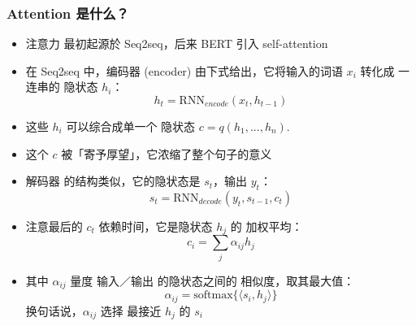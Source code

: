 \documentclass[16pt]{beamer}
\newcommand{\emp}[1]{{\color{violet}#1}}
\begin{document}
\begin{frame}
\frametitle{Attention 是什么？}
\begin{itemize}
	\item 注意力 最初起源於 Seq2seq，后来 BERT 引入 self-attention

	\item 在 Seq2seq 中，编码器 (encoder) 由下式给出，它将输入的词语 $x_i$ 转化成 一连串的 隐状态 $h_i$：
	\begin{equation}
	h_t = \mbox{RNN}_{encode}(x_t, h_{t-1})
	\end{equation}

	\item 这些 $h_i$ 可以综合成单一个 隐状态 $c = q(h_1, ..., h_n)$. 

	\item 这个 $c$ 被「寄予厚望」，它浓缩了整个句子的意义
	
	\item 解码器 的结构类似，它的隐状态是 $s_t$，输出 $y_t$：
	\begin{equation}
	s_t = \mbox{RNN}_{decode}(y_t, s_{t-1}, c_t)
	\end{equation}
	
	\item 注意最后的 $c_t$ 依赖时间，它是隐状态 $h_j$ 的 \emp{加权平均}：
	\begin{equation}
	c_i = \sum_j \alpha_{ij} h_j
	\end{equation}
	
	\item 其中 $\alpha_{ij}$ 量度 输入／输出 的隐状态之间的 \emp{相似度}，取其最大值：
	\begin{equation}
	\alpha_{ij} = \mbox{softmax} \{ \langle s_i, h_j \rangle \}
	\end{equation}
	换句话说，$\alpha_{ij}$ \emp{选择} 最接近 $h_j$ 的 $s_i$
\end{itemize}
\end{frame}
\end{document}
